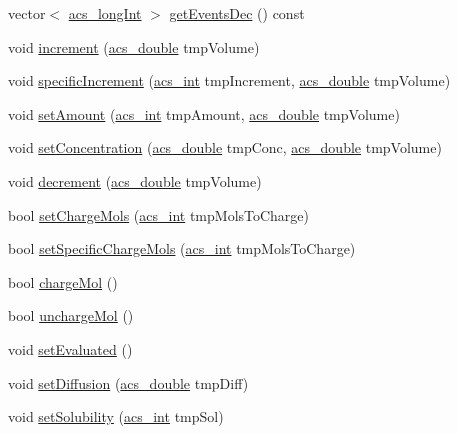 \begin{DoxyCompactItemize}
\item 
vector$<$ \hyperlink{a00050_a19319d75f02db4308bc5c0026d98cd85}{acs\-\_\-long\-Int} $>$ \hyperlink{a00022_a8795bf65e0742060be0b6dcfd06dcc1c}{get\-Events\-Dec} () const 
\item 
void \hyperlink{a00022_a77f68017e5c50f8943df90efd2e8a0bb}{increment} (\hyperlink{a00050_ab776853a005fcbf56af0424a2a4dd607}{acs\-\_\-double} tmp\-Volume)
\item 
void \hyperlink{a00022_a87e85a2397e5ec34518efa235b529d7e}{specific\-Increment} (\hyperlink{a00050_a8d277355641a098190360234e2ebde35}{acs\-\_\-int} tmp\-Increment, \hyperlink{a00050_ab776853a005fcbf56af0424a2a4dd607}{acs\-\_\-double} tmp\-Volume)
\item 
void \hyperlink{a00022_abefdc30b6f352e5ce5576a610015f5b8}{set\-Amount} (\hyperlink{a00050_a8d277355641a098190360234e2ebde35}{acs\-\_\-int} tmp\-Amount, \hyperlink{a00050_ab776853a005fcbf56af0424a2a4dd607}{acs\-\_\-double} tmp\-Volume)
\item 
void \hyperlink{a00022_a018a8f55746849f4814b4d281d4aca5a}{set\-Concentration} (\hyperlink{a00050_ab776853a005fcbf56af0424a2a4dd607}{acs\-\_\-double} tmp\-Conc, \hyperlink{a00050_ab776853a005fcbf56af0424a2a4dd607}{acs\-\_\-double} tmp\-Volume)
\item 
void \hyperlink{a00022_ae5142c6ab199459bc1d7d5945c761f0e}{decrement} (\hyperlink{a00050_ab776853a005fcbf56af0424a2a4dd607}{acs\-\_\-double} tmp\-Volume)
\item 
bool \hyperlink{a00022_a27f9852312659597efe7925124152286}{set\-Charge\-Mols} (\hyperlink{a00050_a8d277355641a098190360234e2ebde35}{acs\-\_\-int} tmp\-Mols\-To\-Charge)
\item 
bool \hyperlink{a00022_a088763fc6b6279040920d219f314c90e}{set\-Specific\-Charge\-Mols} (\hyperlink{a00050_a8d277355641a098190360234e2ebde35}{acs\-\_\-int} tmp\-Mols\-To\-Charge)
\item 
bool \hyperlink{a00022_adc36fb991695aed6503b8ed82e06bca5}{charge\-Mol} ()
\item 
bool \hyperlink{a00022_acf8588148932adb86229eec28f7cde7c}{uncharge\-Mol} ()
\item 
void \hyperlink{a00022_a089da38f8016bd588fa262cd836d1c4d}{set\-Evaluated} ()
\item 
void \hyperlink{a00022_ab4b4adbc3c26e3a8c81a090c9d1330e3}{set\-Diffusion} (\hyperlink{a00050_ab776853a005fcbf56af0424a2a4dd607}{acs\-\_\-double} tmp\-Diff)
\item 
void \hyperlink{a00022_a27c2d0448e1f56e0962132d8d360fc07}{set\-Solubility} (\hyperlink{a00050_a8d277355641a098190360234e2ebde35}{acs\-\_\-int} tmp\-Sol)

\end{DoxyCompactItemize}
